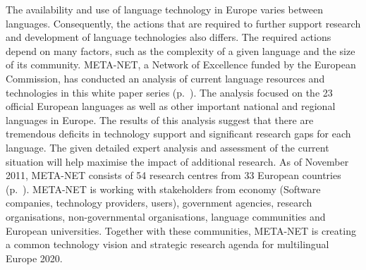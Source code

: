 \begin{Parallel}[c]{78mm}{78mm}
{The availability and use of language technology in Europe varies between languages. Consequently, the actions that are required to further support research and development of language technologies also differs. The required actions depend on many factors, such as the complexity of a given language and the size of its community. META-NET, a Network of Excellence funded by the European Commission, has conducted an  analysis of current language resources and technologies in this white paper series (p.~\pageref{whitepaperseries}). The analysis focused on the 23 official European languages as well as other important national and regional languages in Europe. The results of this analysis suggest that there are tremendous deficits in technology support and significant research gaps for each language. The given detailed expert analysis and assessment of the current situation will help maximise the impact of additional research. As of November 2011, META-NET consists of 54 research centres from 33 European countries (p.~\pageref{metanetmembers}). META-NET is working with stakeholders from economy (Software companies, technology providers, users), government agencies, research organisations, non-governmental organisations, language communities and European universities. Together with these communities, META-NET is creating a common technology vision and strategic research agenda for multilingual Europe 2020.} 
\ParallelPar
\end{Parallel}


\cleardoublepage

\renewcommand\contentsname{}
\tableofcontents



\cleardoublepage

\setcounter{page}{1}
\pagestyle{scrheadings}



